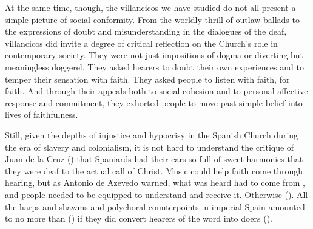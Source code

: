 
At the same time, though, the villancicos we have studied do not all present a
simple picture of social conformity.
From the worldly thrill of  outlaw ballads to the expressions of
doubt and misunderstanding in the dialogues of the deaf, villancicos did invite
a degree of critical reflection on the Church's role in contemporary society.
They were not just impositions of dogma or diverting but meaningless doggerel.
They asked hearers to doubt their own experiences and to temper their sensation
with faith.
They asked people to listen with faith, for faith.
And through their appeals both to social cohesion and to personal affective
response and commitment, they exhorted people to move past simple belief into
lives of faithfulness.


Still, given the depths of injustice and hypocrisy in the Spanish Church during
the era of slavery and colonialism, it is not hard to understand the critique
of Juan de la Cruz () that Spaniards had their ears so
full of sweet harmonies that they were deaf to the actual call of Christ.%
    \Autocite
    [, , ]
    {JuandelaCruz:Subida}
Music could help faith come through hearing, but as Antonio de Azevedo warned,
what was heard had to come from , and people needed
to be equipped to understand and receive it.%
    \Autocite{Azevedo:Catecismo}
Otherwise 
().
All the harps and shawms and polychoral counterpoints in imperial Spain
amounted to no more than 
() if they did convert hearers of the word into doers
().


